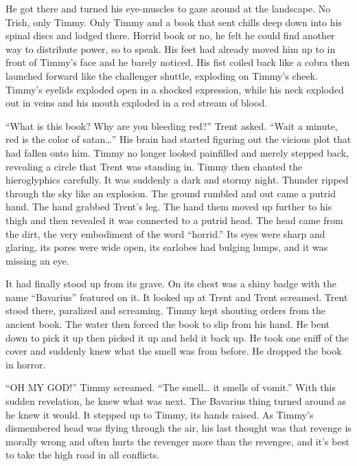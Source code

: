 He got there and turned his eye-muscles to gaze around at the
landscape. No Trish, only Timmy. Only Timmy and a book that sent
chills deep down into his spinal discs and lodged there. Horrid
book or no, he felt he could find another way to distribute power,
so to speak. His feet had already moved him up to in front of
Timmy's face and he barely noticed. His fist coiled back like a
cobra then launched forward like the challenger shuttle, exploding
on Timmy's cheek. Timmy's eyelids exploded open in a shocked
expression, while his neck exploded out in veins and his mouth
exploded in a red stream of blood.



``What is this book? Why are you bleeding red?'' Trent asked. ``Wait a
minute, red is the color of satan{\ldots}'' His brain had started
figuring out the vicious plot that had fallen onto him. Timmy no
longer looked painfilled and merely stepped back, revealing a
circle that Trent was standing in. Timmy then chanted the
hieroglyphics carefully. It was suddenly a dark and stormy night.
Thunder ripped through the sky like an explosion. The ground
rumbled and out came a putrid hand. The hand grabbed Trent's leg.
The hand them moved up further to his thigh and then revealed it
was connected to a putrid head. The head came from the dirt, the
very embodiment of the word ``horrid.'' Its eyes were sharp and
glaring, its pores were wide open, its earlobes had bulging lumps,
and it was missing an eye.



It had finally stood up from its grave. On its chest was a shiny
badge with the name ``Bavarius'' featured on it. It looked up at
Trent and Trent screamed. Trent stood there, paralized and
screaming. Timmy kept shouting orders from the ancient book. The
water then forced the book to slip from his hand. He bent down to
pick it up then picked it up and held it back up. He took one sniff
of the cover and suddenly knew what the smell was from before. He
dropped the book in horror.



``OH MY GOD!'' Timmy screamed. ``The smell{\ldots} it smells of vomit.''
With this sudden revelation, he knew what was next. The Bavarius
thing turned around as he knew it would. It stepped up to Timmy,
its hands raised. As Timmy's dismembered head was flying
through the air, his last thought was that revenge is morally wrong
and often hurts the revenger more than the revengee, and it's best
to take the high road in all conflicts. 


